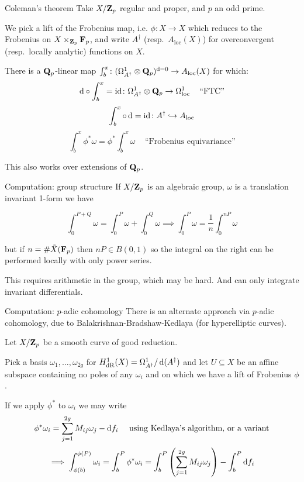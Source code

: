 \begin{frame}{Coleman's theorem}
    Take \(X/\mathbf{Z}_p\) regular and proper, and \(p\) an odd prime.

    We pick a lift of the Frobenius map, i.e. \(\phi\colon X \to X\) which reduces to the Frobenius on $X\times_{\mathbf{Z}_p} \mathbf F_p$, and write \(A^\dagger\) (resp.\ \(A_{\text{loc}}(X)\)) for overconvergent (resp.\ locally analytic) functions on \(X\).
    \pause%
    \begin{theorem}[{Coleman}]\label{thm-coleman-harvey-int}
        There is a \(\mathbf Q_p\)-linear map \(\int_b^x\colon (\Omega_{A^\dagger}^1\otimes \mathbf Q_p)^{\mathop{}\!\mathrm{d} = 0} \to A_\mathrm{loc} (X)\) for which:\leavevmode%
        \[\mathop{}\!\mathrm{d} \circ \int_b^x = \mathrm{id}\colon \Omega_{A^\dagger}^1\otimes \mathbf Q_p \to \Omega_{\text{loc}}^1\,\quad\text{``FTC''}\]%
        \[\int_b^x\circ\mathop{}\!\mathrm{d} = \mathrm{id}\colon A^\dagger \hookrightarrow A_{\mathrm{loc}}\]%
        \[\int_b^x \phi^*\omega = \phi^*\int_b^x \omega\,\quad\text{``Frobenius equivariance''}\]%
    \end{theorem}

    This also works over extensions of $\mathbf Q_p$.

\end{frame}

\begin{frame}{Computation: group structure}
    If $X/\mathbf{Z}_p$ is an algebraic group, $\omega $ is a translation invariant 1-form we have

    \[\int_0^{P+Q} \omega  = \int_0^P \omega + \int_0^Q \omega \implies \int_0^{P} \omega  = \frac 1n\int_0^{nP} \omega \]

    but if $n = \# \tilde X(\mathbf F_p)$ then $nP \in B(0,1)$ so the integral on the right can be performed locally with only power series.

    \pause
    This requires arithmetic in the group, which may be hard.
    And can only integrate invariant differentials.


\end{frame}

\begin{frame}{Computation: $p$-adic cohomology}
    There is an alternate approach via $p$-adic cohomology, due to Balakrishnan-Bradshaw-Kedlaya (for hyperelliptic curves).

    Let $X/\mathbf{Z}_p$ be a smooth curve of good reduction.

    Pick a basis $\omega_1, \ldots, \omega_{2g}$ for $H^1_\mathrm{dR}(X) = \Omega _{A^\dagger}^1/\mathop{}\!\mathrm{d}(A^\dagger)$ and let $U \subseteq X$ be an affine subspace containing no poles of any $\omega_i$ and on which we have a lift of Frobenius $\phi$.\pause

    If we apply $\phi^*$ to $\omega_i$ we may write
    \[\phi^* \omega_i = \sum_{j=1}^{2g} M_{ij} \omega_j  - \mathop{}\!\mathrm{d} f_i\quad\text{ using Kedlaya's algorithm, or a variant}\]\pause
    \[\implies \int_{\phi(b)}^{\phi(P)} \omega_i = \int_b^P \phi^* \omega_i = \int_b^P \left(\sum_{j=1}^{2g} M_{ij} \omega_j\right)  - \int_b^P \mathop{}\!\mathrm{d} f_i\]

\end{frame}

